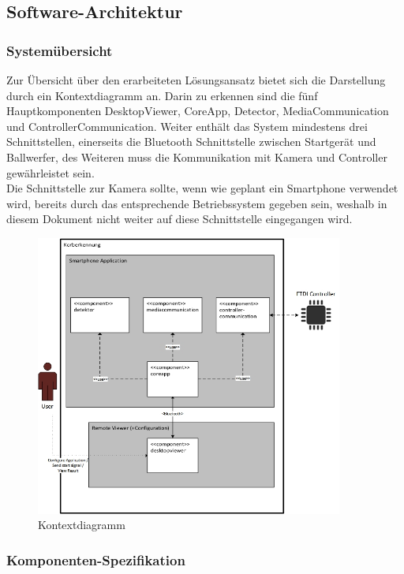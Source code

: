 \subsection{Software-Architektur}
	\subsubsection{Systemübersicht}
	Zur Übersicht über den erarbeiteten Lösungsansatz bietet sich die Darstellung durch ein Kontextdiagramm an. Darin zu erkennen sind die fünf Hauptkomponenten  DesktopViewer, CoreApp, Detector, MediaCommunication und ControllerCommunication. Weiter enthält das System mindestens drei Schnittstellen, einerseits die Bluetooth Schnittstelle zwischen Startgerät und Ballwerfer, des Weiteren muss die Kommunikation mit Kamera und Controller gewährleistet sein.\\ 
	Die Schnittstelle zur Kamera sollte, wenn wie geplant ein Smartphone verwendet wird, bereits durch das entsprechende Betriebssystem gegeben sein, weshalb in diesem Dokument nicht weiter auf diese Schnittstelle eingegangen wird. 
\begin{figure}[h!]
		\centering
		\includegraphics[width=0.9\textwidth]{Enddokumentation/Loesungskonzept/Bilder/Kontextdiagramm_v2.jpg}
		\caption{Kontextdiagramm}		
\end{figure}


	\subsubsection{Komponenten-Spezifikation}
